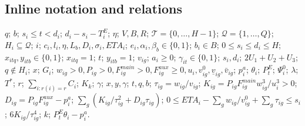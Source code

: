 \documentclass[10pt]{article}
\begin{document}
\subsection*{Inline notation and relations}
$q$; $b$; $s_i\le t<d_i$; $d_i-s_i-T_i^E$; $\eta$; $V,B,R$; $\mathcal T=\{0,\ldots,H-1\}$; $\mathcal Q=\{1,\ldots,Q\}$; $H_i\subseteq\mathcal Q$; $i$; $c_i,l_i,\eta,L_b,D_i,\sigma_i,ETA_i$; $e_i,\alpha_i,\beta_b\in\{0,1\}$; $b_i\in B$; $0\le s_i\le d_i\le H$; $x_{itq},y_{itb}\in\{0,1\}$; $x_{itq}=1$; $t$; $y_{itb}=1$; $v_{ig}$; $a_i\ge0$; $\gamma_{it}\in\{0,1\}$; $s_i,d_i$; $2U_1+U_2+U_3$; $q\notin H_i$; $x$; $G_i$; $w_{ig}>0,P_{ig}>0,F^{main}_{ig}>0,
F^{aux}_{ig}\ge0,u_i,v^0_{ig},\underline v_{ig},\bar v_{ig}$; $p_i^a$; $\theta_i$; $P_t^E$; $\Psi_i^0$; $\lambda$; $T^*$; $r$; $\sum_{i:r(i)=r}C_i$; $K_k$; $\gamma$; $x,y,\gamma$; $t,q,b$; $\tau_{ig}=w_{ig}/v_{ig}$; $K_{ig}=P_{ig}F^{main}_{ig}w_{ig}^3/u_i^3>0$; $D_{ig}=P_{ig}F^{aux}_{ig}-p_i^a$; $\sum_g(K_{ig}/\tau_{ig}^2+D_{ig}\tau_{ig})$; $0\le ETA_i-\sum_gw_{ig}/v^0_{ig}+\sum_g\tau_{ig}\le s_i$; $6K_{ig}/\tau_{ig}^4$; $k$; $P_t^E\theta_i-p_i^a$.
\end{document}
